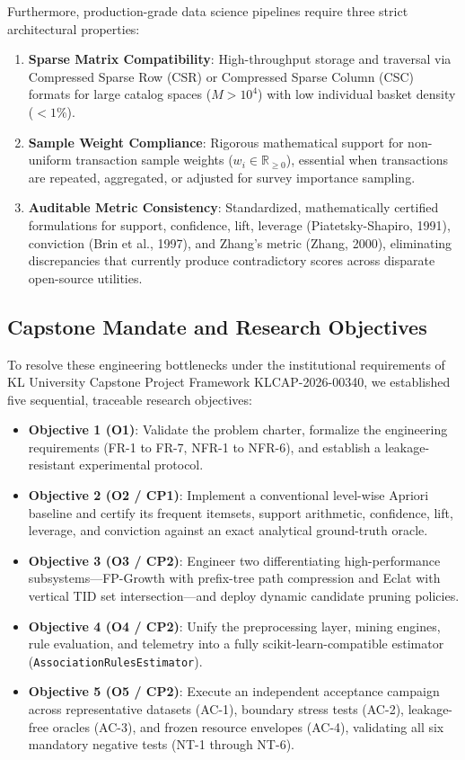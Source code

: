 \documentclass[11pt,a4paper]{article}
\begin{document}
Furthermore, production-grade data science pipelines require three strict architectural properties:
\begin{enumerate}
    \item \textbf{Sparse Matrix Compatibility}: High-throughput storage and traversal via Compressed Sparse Row (CSR) or Compressed Sparse Column (CSC) formats for large catalog spaces ($M > 10^4$) with low individual basket density ($< 1\%$).
    \item \textbf{Sample Weight Compliance}: Rigorous mathematical support for non-uniform transaction sample weights ($w_i \in \mathbb{R}_{\ge 0}$), essential when transactions are repeated, aggregated, or adjusted for survey importance sampling.
    \item \textbf{Auditable Metric Consistency}: Standardized, mathematically certified formulations for support, confidence, lift, leverage (Piatetsky-Shapiro, 1991), conviction (Brin et al., 1997), and Zhang's metric (Zhang, 2000), eliminating discrepancies that currently produce contradictory scores across disparate open-source utilities.
\end{enumerate}

\subsection{Capstone Mandate and Research Objectives}
To resolve these engineering bottlenecks under the institutional requirements of KL University Capstone Project Framework KLCAP-2026-00340, we established five sequential, traceable research objectives:
\begin{itemize}
    \item \textbf{Objective 1 (O1)}: Validate the problem charter, formalize the engineering requirements (FR-1 to FR-7, NFR-1 to NFR-6), and establish a leakage-resistant experimental protocol.
    \item \textbf{Objective 2 (O2 / CP1)}: Implement a conventional level-wise Apriori baseline and certify its frequent itemsets, support arithmetic, confidence, lift, leverage, and conviction against an exact analytical ground-truth oracle.
    \item \textbf{Objective 3 (O3 / CP2)}: Engineer two differentiating high-performance subsystems—FP-Growth with prefix-tree path compression and Eclat with vertical TID set intersection—and deploy dynamic candidate pruning policies.
    \item \textbf{Objective 4 (O4 / CP2)}: Unify the preprocessing layer, mining engines, rule evaluation, and telemetry into a fully scikit-learn-compatible estimator (\texttt{AssociationRulesEstimator}).
    \item \textbf{Objective 5 (O5 / CP2)}: Execute an independent acceptance campaign across representative datasets (AC-1), boundary stress tests (AC-2), leakage-free oracles (AC-3), and frozen resource envelopes (AC-4), validating all six mandatory negative tests (NT-1 through NT-6).
\end{itemize}
\end{document}
